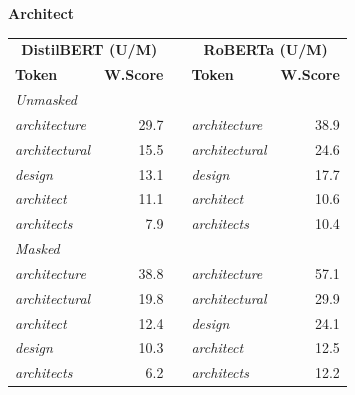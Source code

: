\documentclass[11pt]{article}
\begin{document}
\vspace{4pt}\noindent\textbf{Architect}
\begin{center}\scriptsize
\begin{tabular}{lrllr}
\toprule
\multicolumn{2}{c}{\textbf{DistilBERT (U/M)}} & & \multicolumn{2}{c}{\textbf{RoBERTa (U/M)}} \\
\textbf{Token} & \textbf{W.Score} & & \textbf{Token} & \textbf{W.Score} \\
\midrule
\multicolumn{5}{l}{\textit{Unmasked}} \\
\emph{architecture} & 29.7 & & \emph{architecture} & 38.9 \\
\emph{architectural} & 15.5 & & \emph{architectural} & 24.6 \\
\emph{design} & 13.1 & & \emph{design} & 17.7 \\
\emph{architect} & 11.1 & & \emph{architect} & 10.6 \\
\emph{architects} & 7.9 & & \emph{architects} & 10.4 \\
\multicolumn{5}{l}{\textit{Masked}} \\
\emph{architecture} & 38.8 & & \emph{architecture} & 57.1 \\
\emph{architectural} & 19.8 & & \emph{architectural} & 29.9 \\
\emph{architect} & 12.4 & & \emph{design} & 24.1 \\
\emph{design} & 10.3 & & \emph{architect} & 12.5 \\
\emph{architects} & 6.2 & & \emph{architects} & 12.2 \\
\bottomrule
\end{tabular}
\end{center}
\end{document}

